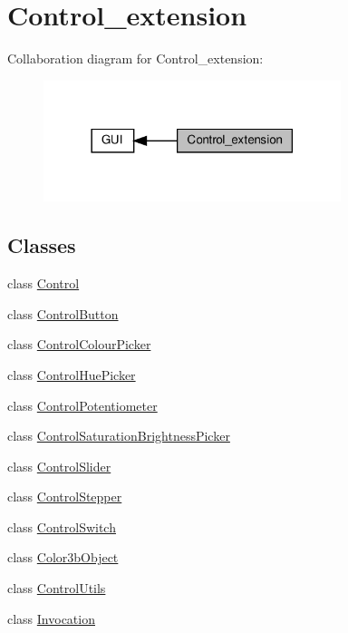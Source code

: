 \hypertarget{group__control__extension}{}\section{Control\+\_\+extension}
\label{group__control__extension}
Collaboration diagram for Control\+\_\+extension\+:
\nopagebreak
\begin{figure}[H]
\begin{center}
\leavevmode
\includegraphics[width=246pt]{group__control__extension}
\end{center}
\end{figure}
\subsection*{Classes}
\begin{DoxyCompactItemize}
\item 
class \hyperlink{classControl}{Control}
\item 
class \hyperlink{classControlButton}{Control\+Button}
\item 
class \hyperlink{classControlColourPicker}{Control\+Colour\+Picker}
\item 
class \hyperlink{classControlHuePicker}{Control\+Hue\+Picker}
\item 
class \hyperlink{classControlPotentiometer}{Control\+Potentiometer}
\item 
class \hyperlink{classControlSaturationBrightnessPicker}{Control\+Saturation\+Brightness\+Picker}
\item 
class \hyperlink{classControlSlider}{Control\+Slider}
\item 
class \hyperlink{classControlStepper}{Control\+Stepper}
\item 
class \hyperlink{classControlSwitch}{Control\+Switch}
\item 
class \hyperlink{classColor3bObject}{Color3b\+Object}
\item 
class \hyperlink{classControlUtils}{Control\+Utils}
\item 
class \hyperlink{classInvocation}{Invocation}
\end{DoxyCompactItemize}
